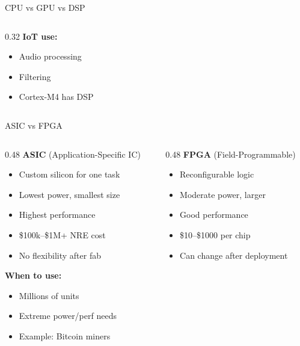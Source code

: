 \documentclass[aspectratio=169,11pt]{beamer}
\begin{document}
\begin{frame}{CPU vs GPU vs DSP}
\begin{columns}[T]
\begin{column}{0.32\textwidth}
            \vspace{0.2cm}
            \textbf{IoT use:}
            \begin{itemize}
                \item Audio processing
                \item Filtering
                \item Cortex-M4 has DSP
            \end{itemize}
        \end{column}
    \end{columns}
\end{frame}

\begin{frame}{ASIC vs FPGA}
    \begin{columns}[T]
        \begin{column}{0.48\textwidth}
            \textbf{ASIC} (Application-Specific IC)
            \begin{itemize}
                \item Custom silicon for one task
                \item Lowest power, smallest size
                \item Highest performance
                \item \$100k--\$1M+ NRE cost
                \item No flexibility after fab
            \end{itemize}
            
            \vspace{0.2cm}
            \textbf{When to use:}
            \begin{itemize}
                \item Millions of units
                \item Extreme power/perf needs
                \item Example: Bitcoin miners
            \end{itemize}
        \end{column}
        \begin{column}{0.48\textwidth}
            \textbf{FPGA} (Field-Programmable)
            \begin{itemize}
                \item Reconfigurable logic
                \item Moderate power, larger
                \item Good performance
                \item \$10--\$1000 per chip
                \item Can change after deployment
            \end{itemize}
            

\end{column}
\end{columns}
\end{frame}
\end{document}
